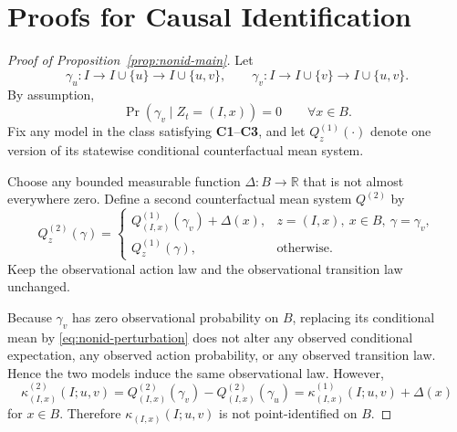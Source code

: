 \documentclass{article}
\theoremstyle{definition}
\newcommand{\RR}{\mathbb R}
\begin{document}
\section{Proofs for Causal Identification}
\label{app:causal}

\begin{proof}[Proof of Proposition~\ref{prop:nonid-main}]
Let
\[
\gamma_u:
I\to I\cup\{u\}\to I\cup\{u,v\},
\qquad
\gamma_v:
I\to I\cup\{v\}\to I\cup\{u,v\}.
\]
By assumption,
\[
\Pr(\gamma_v\mid Z_t=(I,x))=0
\qquad \forall x\in B.
\]
Fix any model in the class satisfying \textbf{C1}--\textbf{C3}, and let \(Q^{(1)}_z(\cdot)\) denote one version of its statewise conditional counterfactual mean system.

Choose any bounded measurable function \(\Delta:B\to\RR\) that is not almost everywhere zero. Define a second counterfactual mean system \(Q^{(2)}\) by
\begin{equation}
Q^{(2)}_z(\gamma)=
\begin{cases}
Q^{(1)}_{(I,x)}(\gamma_v)+\Delta(x), & z=(I,x),\ x\in B,\ \gamma=\gamma_v,\\
Q^{(1)}_z(\gamma), & \text{otherwise}.
\end{cases}
\label{eq:nonid-perturbation}
\end{equation}
Keep the observational action law and the observational transition law unchanged.

Because \(\gamma_v\) has zero observational probability on \(B\), replacing its conditional mean by \eqref{eq:nonid-perturbation} does not alter any observed conditional expectation, any observed action probability, or any observed transition law. Hence the two models induce the same observational law. However,
\[
\kappa^{(2)}_{(I,x)}(I;u,v)
=
Q^{(2)}_{(I,x)}(\gamma_v)-Q^{(2)}_{(I,x)}(\gamma_u)
=
\kappa^{(1)}_{(I,x)}(I;u,v)+\Delta(x)
\]
for \(x\in B\). Therefore \(\kappa_{(I,x)}(I;u,v)\) is not point-identified on \(B\).
\end{proof}
\end{document}

